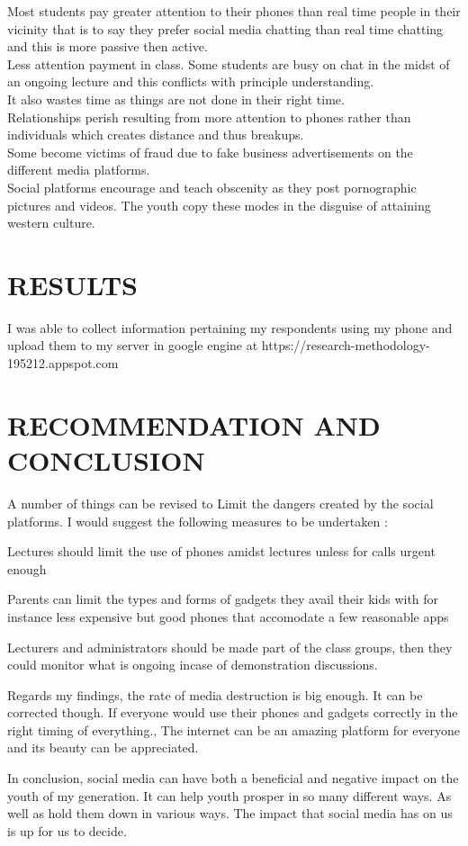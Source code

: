 \documentclass[12pt,A4paper]{article}
\begin{document}
Most students pay greater attention to their phones than real time people in their vicinity that is to say they prefer social media chatting than real time chatting and this is more passive then active.\\

Less attention payment in class. Some students are busy on chat in the midst of an ongoing lecture and this conflicts with principle understanding.\\
 It also wastes time as things are not done in their right time.\\

Relationships perish resulting from more attention to phones rather than individuals which creates distance and thus breakups.\\

Some become victims of fraud due to fake business advertisements on the different media platforms.\\
 
Social platforms encourage and teach obscenity as they post pornographic pictures and videos. The youth copy these modes in the disguise of attaining western culture.\\


\section{RESULTS} 

I was able to collect information pertaining my respondents using  my phone and upload them to my server in google engine at https://research-methodology-195212.appspot.com


\section{RECOMMENDATION AND CONCLUSION}

A number of things can be revised to Limit the dangers created  by the social platforms. I would suggest the following measures to be undertaken :

Lectures should limit the use of phones amidst lectures unless for calls urgent enough

Parents can limit the types and forms of gadgets they avail their kids with for instance less expensive but good phones that accomodate a few reasonable apps

Lecturers and administrators should be made part of the class groups, then they could monitor what is ongoing incase of demonstration discussions.

Regards my findings, the rate of media destruction is big enough. It can be corrected though. If everyone would use their phones and gadgets correctly in the right timing of everything., The internet can be an amazing platform for everyone and its beauty can be appreciated.

	
In conclusion, social media can have both a beneficial and negative impact on the youth of my generation. It can help youth prosper in so many different ways. As well as hold them down in various ways. The impact that social media has on us is up for us to decide.
\end{document}
